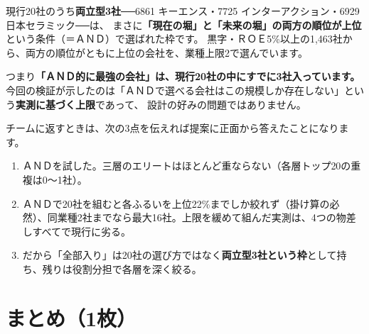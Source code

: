 \documentclass[a4paper,10.5pt]{article}
\newcommand{\jt}[1]{\textsf{\bfseries\color{navy}#1}}
\begin{document}
\begin{keybox}
現行20社のうち\jt{両立型3社}──6861 キーエンス・7725 インターアクション・6929 日本セラミック──は、
まさに\textbf{「現在の堀」と「未来の堀」の両方の順位が上位}という条件（＝ＡＮＤ）で選ばれた枠です。
黒字・ＲＯＥ5\%以上の1,463社から、両方の順位がともに上位の会社を、業種上限2で選んでいます。

つまり\textbf{「ＡＮＤ的に最強の会社」は、現行20社の中にすでに3社入っています。}
今回の検証が示したのは「ＡＮＤで選べる会社はこの規模しか存在しない」という\textbf{実測に基づく上限}であって、
設計の好みの問題ではありません。
\end{keybox}

チームに返すときは、次の3点を伝えれば提案に正面から答えたことになります。

\begin{enumerate}[leftmargin=1.4em,itemsep=2pt]
\item ＡＮＤを試した。三層のエリートはほとんど重ならない（各層トップ20の重複は0〜1社）。
\item ＡＮＤで20社を組むと各ふるいを上位22\%までしか絞れず（掛け算の必然）、同業種2社までなら最大16社。上限を緩めて組んだ実測は、4つの物差しすべてで現行に劣る。
\item だから「全部入り」は20社の選び方ではなく\textbf{両立型3社という枠}として持ち、残りは役割分担で各層を深く絞る。
\end{enumerate}

\section{まとめ（1枚）}
\end{document}
